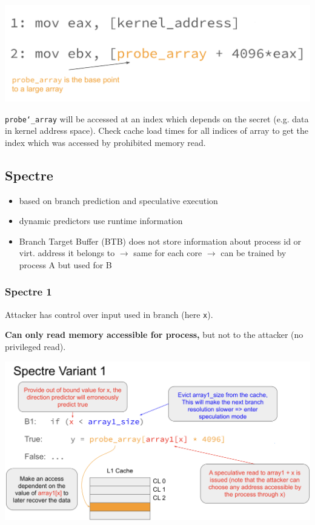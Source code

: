 \begin{center}
    \includegraphics[width=0.8\linewidth]{images/meltdown-cache.png}
\end{center}

\texttt{probe\char`_array} will be accessed at an index which depends on the secret (e.g. data in kernel address space).
Check cache load times for all indices of array to get the index which was accessed by prohibited memory read.

\subsection{Spectre}
\begin{itemize}
    \item based on branch prediction and speculative execution
    \item dynamic predictors use runtime information
    \item Branch Target Buffer (BTB) does not store information about process id or virt. address it belongs to $\xrightarrow{}$ same for each core $\xrightarrow{}$ can be trained by process A but used for B
\end{itemize}

\subsubsection{Spectre 1}
Attacker has control over input used in branch (here \texttt{x}).

\textbf{Can only read memory accessible for process,} but not to the attacker (no privileged read).

\begin{center}
    \includegraphics[width=\linewidth]{images/spectre1-overview.png}
\end{center}

